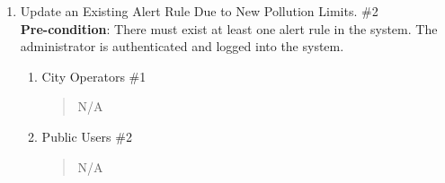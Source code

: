 \documentclass[]{article}
\begin{document}
\begin{enumerate}[{\bf BE2.}]
	\item Update an Existing Alert Rule Due to New Pollution Limits. \#2 \\ 
    \textbf{Pre-condition}: There must exist at least one alert rule in the system. The administrator is authenticated and logged into the system.
    
		\begin{enumerate}[{\bf VP1.}]
			\item City Operators \#1 
                \begin{quote}
                    N/A
                \end{quote}
                
			\item Public Users \#2 
				\begin{quote}
				    N/A
				\end{quote}
                

\end{enumerate}
\end{enumerate}
\end{document}
